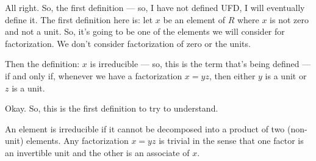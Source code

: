 \begin{speech}[00:06:58 - 00:07:50]
All right. So, the first definition --- so, I have not defined UFD, I will eventually define it. The first definition here  is: let $x$  be an element of $R$ where $x$ is not zero and not a unit. So, it's going to be one of the elements we will consider for factorization. We don't consider factorization of zero or the units.

Then the definition: $x$ is irreducible  --- so, this is the term that's being defined --- if and only if,  whenever  we have a factorization $x = y z$,  then  either $y$  is a unit or $z$  is a unit.

Okay. So, this is the first definition to try to understand.
\end{speech}

\begin{content}

\begin{steps}
An element is irreducible if it cannot be decomposed into a product of two  (non-unit) elements. Any factorization $x = yz$ is trivial in the sense that one factor is an invertible unit and the other is an associate of $x$.
\end{steps}
\end{content}

